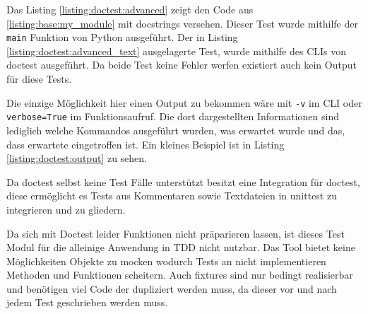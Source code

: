Das Listing \ref{listing:doctest:advanced} zeigt den Code aus \ref{listing:base:my_module} mit
\Glspl{docstring} versehen. Dieser Test wurde mithilfe der \lstinline{main} Funktion von Python
ausgeführt. Der in Listing \ref{listing:doctest:advanced_text} ausgelagerte Test, wurde mithilfe
des CLIs von doctest ausgeführt. Da beide Test keine Fehler werfen existiert auch kein Output
für diese Tests.

Die einzige Möglichkeit hier einen Output zu bekommen wäre mit \lstinline{-v} im CLI oder
\lstinline{verbose=True} im Funktionsaufruf. Die dort dargestellten Informationen sind
lediglich welche Kommandos ausgeführt wurden, was erwartet wurde und das, dass erwartete
eingetroffen ist. Ein kleines Beispiel ist in Listing \ref{listing:doctest:output} zu sehen.

Da doctest selbst keine Test Fälle unterstützt besitzt  eine
Integration für doctest, diese ermöglicht es Tests aus Kommentaren sowie Textdateien in
unittest zu integrieren und zu gliedern.

Da sich mit Doctest leider Funktionen nicht präparieren lassen, ist dieses Test Modul für die
alleinige Anwendung in TDD nicht nutzbar. Das Tool bietet keine Möglichkeiten Objekte zu \gls{mock}en
wodurch Tests an nicht implementieren Methoden und Funktionen scheitern. Auch \Glspl{fixture} sind
nur bedingt realisierbar und benötigen viel Code der dupliziert werden muss, da dieser vor und nach
jedem Test geschrieben werden muss.